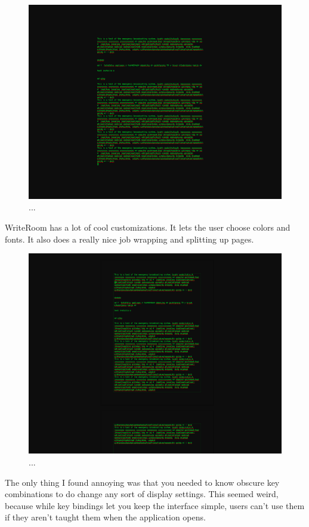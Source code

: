 \documentclass[10pt]{article}
\begin{document}
\begin{figure}
   \centering
      \includegraphics[width=130mm]{images/writeroom1.png}
   \caption{...}
\end{figure}

WriteRoom has a lot of cool customizations. It lets the user choose colors and fonts. It also does a really nice job wrapping and splitting up pages.

\begin{figure}
   \centering
      \includegraphics[width=130mm]{images/writeroom2.png}
   \caption{...}
\end{figure}

The only thing I found annoying was that you needed to know obscure key combinations to do change any sort of display settings. This seemed weird, because while key bindings let you keep the interface simple, users can't use them if they aren't taught them when the application opens.
\end{document}
